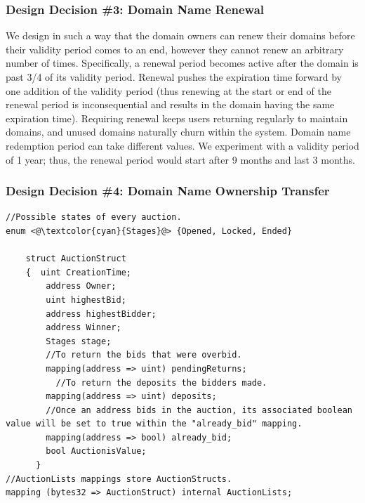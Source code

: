 
\subsubsection{Design Decision \#3: Domain Name Renewal\\}

We design \Ghazal in such a way that the domain owners can renew their domains before their validity period comes to an end, however they cannot renew an arbitrary number of times. Specifically, a renewal period becomes active after the domain is past 3/4 of its validity period. Renewal pushes the expiration time forward by one addition of the validity period (thus renewing at the start or end of the renewal period is inconsequential and results in the domain having the same expiration time). Requiring renewal keeps users returning regularly to maintain domains, and unused domains naturally churn within the system. Domain name redemption period can take different values. We experiment with a validity period of 1 year; thus, the renewal period would start after 9 months and last 3 months. 


\subsubsection{Design Decision \#4: Domain Name Ownership Transfer\\}
\label{sec:revocation}

\begin{lstlisting}[basicstyle=\scriptsize\ttfamily,caption={Implementation of AuctionStruct and AuctionLists mapping in \Ghazalstar smart contract.},label={code:auction},float]
//Possible states of every auction.
enum <@\textcolor{cyan}{Stages}@> {Opened, Locked, Ended} 
   
    struct AuctionStruct  
    {  uint CreationTime;  
        address Owner;    
        uint highestBid;    
        address highestBidder;  
        address Winner;   
        Stages stage;           
        //To return the bids that were overbid.
        mapping(address => uint) pendingReturns;   
	      //To return the deposits the bidders made. 
        mapping(address => uint) deposits;      
        //Once an address bids in the auction, its associated boolean value will be set to true within the "already_bid" mapping.
        mapping(address => bool) already_bid;      
        bool AuctionisValue;                        
      }
//AuctionLists mappings store AuctionStructs.
mapping (bytes32 => AuctionStruct) internal AuctionLists;
\end{lstlisting}

